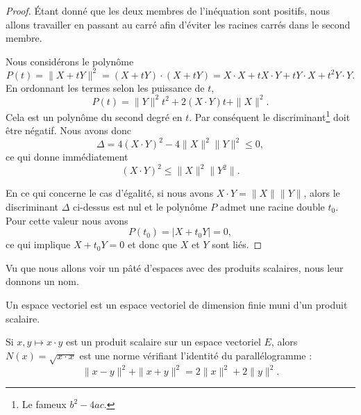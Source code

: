 \begin{proof}
	Étant donné que les deux membres de l'inéquation sont positifs, nous allons travailler en passant au carré afin d'éviter les racines carrés dans le second membre.

	Nous considérons le polynôme
	\begin{equation}
		P(t)=\| X+tY \|^2=(X+tY)\cdot(X+tY)=X\cdot X+tX\cdot Y+tY\cdot X+t^2Y\cdot Y.
	\end{equation}
	En ordonnant les termes selon les puissance de $t$,
	\begin{equation}
		P(t)=\| Y \|^2t^2+2(X\cdot Y)t+\| X \|^2.
	\end{equation}
	Cela est un polynôme du second degré en $t$. Par conséquent le discriminant\footnote{Le fameux $b^2-4ac$.} doit être négatif. Nous avons donc
	\begin{equation}
		\Delta=4(X\cdot Y)^2-4\| X \|^2\| Y \|^2\leq 0,
	\end{equation}
	ce qui donne immédiatement
	\begin{equation}
		(X\cdot Y)^2\leq\| X \|^2\| Y^2 \|.
	\end{equation}

    En ce qui concerne le cas d'égalité, si nous avons \( X\cdot Y=\| X \|\| Y \|\), alors le discriminant \( \Delta\) ci-dessus est nul et le polynôme \( P\) admet une racine double \( t_0\). Pour cette valeur nous avons
    \begin{equation}
        P(t_0)=| X+t_0Y |=0,
    \end{equation}
    ce qui implique \( X+t_0Y=0\) et donc que \( X\) et \( Y\) sont liés.
\end{proof}

Vu que nous allons voir un pâté d'espaces avec des produits scalaires, nous leur donnons un nom.
\begin{definition}\label{DefLZMcvfj}
    Un espace vectoriel  est un espace vectoriel de dimension finie muni d'un produit scalaire.
\end{definition}

\begin{proposition} \label{PropEQRooQXazLz}
    Si \( x,y\mapsto x\cdot y\) est un produit scalaire sur un espace vectoriel \( E\), alors \( N(x)=\sqrt{x\cdot x}\) est une norme vérifiant l'identité du parallélogramme :
    \begin{equation}        \label{EqYCLtWfJ}
        \| x-y \|^2+\| x+y \|^2=2\| x \|^2+2\| y \|^2.
    \end{equation}
\end{proposition}

